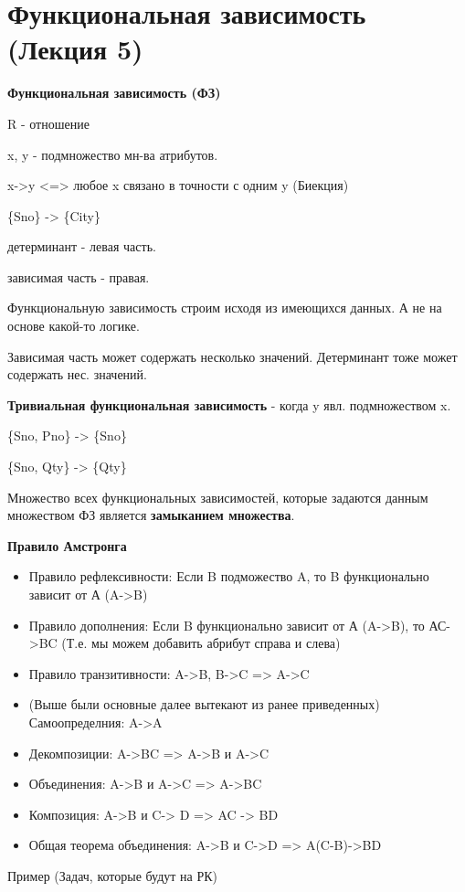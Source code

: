 \chapter{Функциональная зависимость (Лекция 5)}

\textbf{Функциональная зависимость (ФЗ)}

R - отношение

x, y - подмножество мн-ва атрибутов.

x->y <=> любое x связано в точности с одним y (Биекция)

\{Sno\} -> \{City\}

детерминант - левая часть.

зависимая часть - правая.

Функциональную зависимость строим исходя из имеющихся данных.
А не на основе какой-то логике.

Зависимая часть может содержать несколько значений.
Детерминант тоже может содержать нес. значений.

\textbf{Тривиальная функциональная зависимость} - когда y явл. подмножеством x.

\{Sno, Pno\} -> \{Sno\}

\{Sno, Qty\} -> \{Qty\}

Множество всех функциональных зависимостей, которые задаются данным множеством
ФЗ является \textbf{замыканием множества}.

\textbf{Правило Амстронга}

\begin{itemize}
	\item Правило рефлексивности: Если B подможество A, то B функционально зависит от А (A->B)
	\item Правило дополнения: Если B функционально зависит от А (A->B), то АС->BC
	      (Т.е. мы можем добавить абрибут справа и слева)
	\item Правило транзитивности: A->B, B->C => A->C
	\item (Выше были основные далее вытекают из ранее приведенных)
	      Самоопределния: A->A
	\item Декомпозиции: A->BC => A->B и A->C
	\item Объединения: A->B и  A->C => A->BC
	\item Композиция: A->B и C-> D => AC -> BD
	\item Общая теорема объединения: A->B и C->D => A(C-B)->BD
\end{itemize}

Пример (Задач, которые будут на РК)

